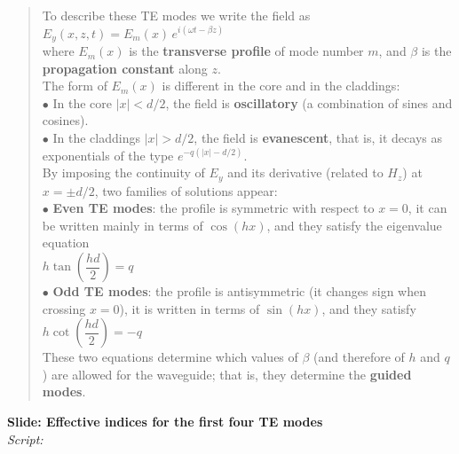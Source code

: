 \documentclass{article}
\begin{document}
\begin{quote}
To describe these TE modes we write the field as\\[1mm]
\(E_y(x,z,t) = E_m(x)\,e^{i(\omega t - \beta z)}\)\\[2mm]
where \(E_m(x)\) is the \textbf{transverse profile} of mode number \(m\), and \(\beta\) is the 
\textbf{propagation constant} along \(z\).\\[2mm]
The form of \(E_m(x)\) is different in the core and in the claddings:\\[1mm]
\(\bullet\) In the core \(|x|<d/2\), the field is \textbf{oscillatory} (a combination of sines and cosines).\\
\(\bullet\) In the claddings \(|x|>d/2\), the field is \textbf{evanescent}, that is, it decays as 
exponentials of the type \(e^{-q(|x|-d/2)}\).\\[2mm]
By imposing the continuity of \(E_y\) and its derivative (related to \(H_z\)) at \(x = \pm d/2\), 
two families of solutions appear:\\[1mm]
\(\bullet\) \textbf{Even TE modes}: the profile is symmetric with respect to \(x=0\), it can be written 
mainly in terms of \(\cos(hx)\), and they satisfy the eigenvalue equation\\[1mm]
\(h \tan\!\left(\dfrac{h d}{2}\right) = q\)\\[2mm]
\(\bullet\) \textbf{Odd TE modes}: the profile is antisymmetric (it changes sign when crossing \(x=0\)), 
it is written in terms of \(\sin(hx)\), and they satisfy\\[1mm]
\(h \cot\!\left(\dfrac{h d}{2}\right) = -q\)\\[2mm]
These two equations determine which values of \(\beta\) (and therefore of \(h\) and \(q\)) are allowed 
for the waveguide; that is, they determine the \textbf{guided modes}.
\end{quote}

\vspace{0.4cm}

\noindent
\textbf{Slide: Effective indices for the first four TE modes}\\[2mm]
\textit{Script:}\\[2mm]
\end{document}
